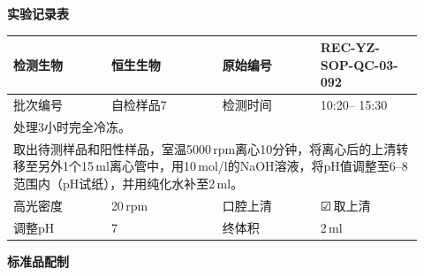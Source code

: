 \documentclass[UTF8,10pt,a4paper,fontset=fandol]{ctexart}
\newcommand{\fieldvalue}[1]{#1}
\newcommand{\handwritten}[1]{#1}
\newcommand{\checkboxfield}[1]{\ifstrequal{#1}{checked}{☑}{\ifstrequal{#1}{unclear}{?}{☐}}}
\begin{document}

\newpage

\begin{center}
\textbf{实验记录表}
\end{center}

\begin{tabular}{|p{0.22\linewidth}|p{0.25\linewidth}|p{0.22\linewidth}|p{0.23\linewidth}|}
\hline
检测生物 & 
\fieldvalue{恒生生物}
&
原始编号 &
\fieldvalue{REC-YZ-SOP-QC-03-092}
\\ \hline
批次编号 &
\fieldvalue{自检样品7}
&
检测时间 &
\fieldvalue{\handwritten{10:20}}--%
\fieldvalue{\handwritten{15:30}}
\\ \hline
\multicolumn{4}{|p{0.92\linewidth}|}{
处理3小时完全冷冻。
}\\ \hline
\multicolumn{4}{|p{0.92\linewidth}|}{
取出待测样品和阳性样品，室温5000\,rpm离心10分钟，将离心后的上清转移至另外1个15\,ml离心管中，用10\,mol/l的NaOH溶液，将pH值调整至6--8范围内（pH试纸），并用纯化水补至2\,ml。
}\\ \hline
高光密度 &
\fieldvalue{\handwritten{20}}\,rpm
&
口腔上清 &
\fieldvalue{\checkboxfield{checked}}\,取上清
\\ \hline
调整pH &
\fieldvalue{\handwritten{7}}
&
终体积 &
\fieldvalue{\handwritten{2}}\,ml
\\ \hline
\end{tabular}

\vspace{0.5em}

\begin{center}
\textbf{标准品配制}
\end{center}
\end{document}
